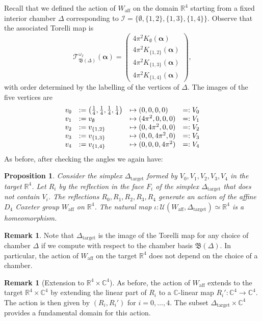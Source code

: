 \documentclass[12pt,letterpaper,reqno]{amsart}
\newtheorem{prop}[thm]{Proposition}
\theoremstyle{remark}
\theoremstyle{definition}
\newtheorem{rem}[thm]{Remark}
\numberwithin{thm}{section}
\numberwithin{equation}{section}
\numberwithin{figure}{section}
\newcommand{\R}{\ensuremath{\mathbb R}}
\newcommand{\C}{\ensuremath{\mathbb C}}
\newcommand{\aff}{\mathrm{aff}}
\newcommand{\Simplex}{\Delta}
\begin{document}
Recall that we defined the action of $W_{\mathrm{aff}}$ on the domain $\R^4$ starting from a fixed interior chamber $\Simplex$ corresponding to 
$\mathcal{I}=\{\emptyset, \{1, 2 \}, \{1, 3\}, \{1,4 \} \}$. Observe that the associated Torelli map is 
\[ \mathcal{T}^{\omega_I}_{\mathfrak{B}(\Simplex)}(\boldsymbol{\alpha})=\begin{pmatrix} 4 \pi^2 K_{\emptyset}(\boldsymbol{\alpha})\\ 4 \pi^2 K_{\{1,2\}}(\boldsymbol{\alpha})\\4 \pi^2 K_{\{1, 3\}}(\boldsymbol{\alpha})\\4 \pi^2 K_{\{1, 4\}}(\boldsymbol{\alpha})\end{pmatrix}, \]
with order determined by the labelling of the vertices of $\Simplex$. The images of the five vertices are
\begin{equation}
\begin{array}{c  l l c }
v_0&:=\left(\frac{1}{4}, \frac{1}{4}, \frac{1}{4}, \frac{1}{4} \right) &\mapsto ( 0, 0, 0, 0)&=:V_0\\
v_1&:=v_{\emptyset} &\mapsto  (4\pi^2, 0, 0, 0)&=:V_1\\
v_2&:=v_{\{1, 2\}} &\mapsto (0, 4\pi^2, 0, 0)&=:V_2 \\
v_3&:=v_{\{1, 3\}} &\mapsto (0, 0, 4\pi^2, 0)&=:V_3\\
v_4&:=v_{\{1, 4\}} &\mapsto (0, 0, 0, 4\pi^2)&=:V_4
\end{array}
\end{equation}
As before, after checking the angles we again have: 
\begin{prop}\label{Prop:target_action}
Consider the simplex $\Simplex_{\mathrm{target}}$ formed by $V_0, V_1, V_2, V_3, V_4$ in the target $\R^4$. Let $R_i$ by the reflection in the face $F_i$ of the simplex $\Simplex_{\mathrm{target}}$ that does not contain $V_i$. The reflections $R_0, R_1, R_2, R_3, R_4$ generate an action of the affine $D_4$ Coxeter group $W_{\mathrm{aff}}$ on $\R^4$. The natural map $\iota: 
\mathcal{U}(W_{\mathrm{aff}},\Simplex_{\mathrm{target}}) \simeq \R^4$ is a homeomorphism.
\end{prop}

\begin{rem}
Note that $\Simplex_{\mathrm{target}}$ is the image of the Torelli map for any choice of chamber $\Simplex$ if we compute with respect to the chamber basis $\mathfrak{B}(\Simplex)$. In particular, the action of $W_\aff$ on the target $\R^4$ does not depend on the choice of a chamber.
\end{rem}
\begin{rem}[Extension to $\R^4 \times \C^4$] 
As before, the action of $W_\aff$
extends to the target $\R^4 \times \C^4$ by extending the linear part of $R_i$ to a $\C$-linear map $R_i' :\C^4 \to \C^4$. The action is then given by $(R_i, R_i')$ for $i=0, \ldots, 4$. The subset $\Simplex_\mathrm{target} \times \C^4$ provides a fundamental domain for this action.
\end{rem}
 
\end{document}

